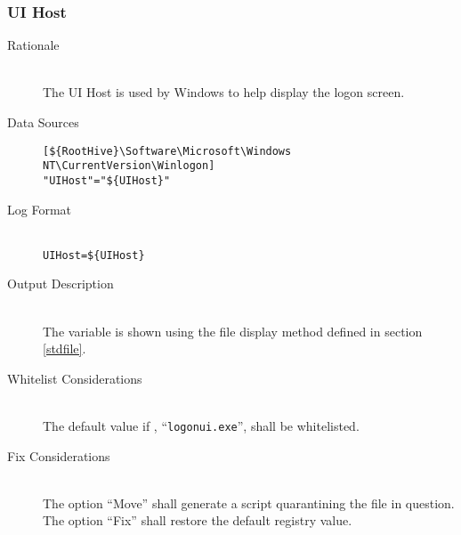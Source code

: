 \subsubsection{UI Host}
\begin{description}
\item[Rationale] \hfill \\
The UI Host is used by Windows to help display the logon screen.
\item[Data Sources] \hfill
\vspace{-\baselineskip}
\begin{verbatim}
[${RootHive}\Software\Microsoft\Windows NT\CurrentVersion\Winlogon]
"UIHost"="${UIHost}"
\end{verbatim}
\item[Log Format] \hfill \\
\verb|UIHost=${UIHost}|
\item[Output Description] \hfill \\
The variable  is shown using the file display method defined in
section \ref{stdfile}.
\item[Whitelist Considerations] \hfill \\
The default value if , ``\verb|logonui.exe|'', shall be whitelisted.
\item[Fix Considerations] \hfill \\
The option ``Move'' shall generate a script quarantining the file in question.
The option ``Fix'' shall restore the default registry value.
\end{description}

